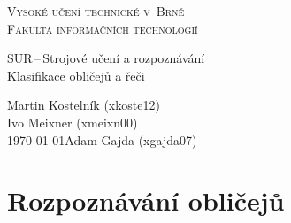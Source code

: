 \documentclass[a4paper,11pt]{article}
\begin{document}
	\begin{titlepage}
		\begin{center}
			\textsc{\Huge Vysoké učení technické v~Brně\\
				\vspace{0.4em}\huge Fakulta informačních technologií}
			
			
			{\LARGE SUR\,--\,Strojové učení a rozpoznávání\\
				\Huge Klasifikace obličejů a řeči\\ \vspace{0.3em}}
			
			
			{\Large \hfill Martin Kostelník (xkoste12)}\\
			{\Large \hfill Ivo Meixner (xmeixn00)}\\
			{\Large \today \hfill Adam Gajda (xgajda07)}
		\end{center}
	\end{titlepage}

	\section{Rozpoznávání obličejů}
		
\end{document}

